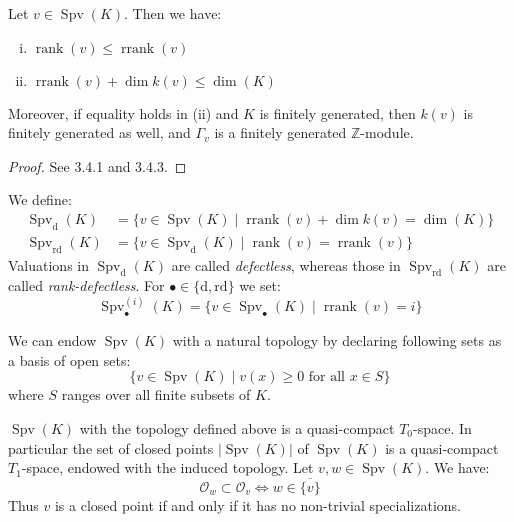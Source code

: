 \begin{lemma}\label{rank-dimension-inequality}
Let $v\in\operatorname{Spv}(K)$. Then we have:
\begin{enumerate}[(i)]
\item $\operatorname{rank}(v)\leq \operatorname{rrank}(v)$
\item $\operatorname{rrank}(v)+\dim k(v)\leq\dim(K)$
\end{enumerate}
Moreover, if equality holds in (ii) and $K$ is finitely generated, then $k(v)$ is finitely generated as well, and $\Gamma_v$ is a finitely generated $\mathbb{Z}$-module.
\end{lemma}

\begin{proof}
See \cite{EP05} 3.4.1 and 3.4.3.
\end{proof}

\begin{definition}
We define:
\begin{align*}
\operatorname{Spv}_\text{d}(K) &= \{v\in\operatorname{Spv}(K)\mid \operatorname{rrank}(v)+\dim k(v)=\dim(K) \} \\
\operatorname{Spv}_\text{rd}(K) &= \{v\in\operatorname{Spv}_\text{d}(K)\mid \operatorname{rank}(v)=\operatorname{rrank}(v) \}
\end{align*}
Valuations in $\operatorname{Spv}_\text{d}(K)$ are called \textit{defectless}, whereas those in $\operatorname{Spv}_\text{rd}(K)$ are called \textit{rank-defectless}. For $\bullet\in\{\text{d},\text{rd}\}$ we set:
\[\operatorname{Spv}_\bullet^{(i)}(K)=\{v\in\operatorname{Spv}_\bullet(K)\mid \operatorname{rrank}(v)=i \} \]
\end{definition}

\begin{definition}
We can endow $\operatorname{Spv}(K)$ with a natural topology by declaring following sets as a basis of open sets:
\[\{v\in\operatorname{Spv}(K)\mid v(x)\geq 0\text{ for all }x\in S\} \]
where $S$ ranges over all finite subsets of $K$. 
\end{definition}

\begin{lemma}\label{spv-topology}
$\operatorname{Spv}(K)$ with the topology defined above is a quasi-compact $T_0$-space. In particular the set of closed points $|\operatorname{Spv}(K)|$ of $\operatorname{Spv}(K)$ is a quasi-compact $T_1$-space, endowed with the induced topology. Let $v,w\in\operatorname{Spv}(K)$. We have:
\[\mathcal{O}_w\subset\mathcal{O}_v \iff w\in\overline{\{v\}} \]
Thus $v$ is a closed point if and only if it has no non-trivial specializations.
\end{lemma}

